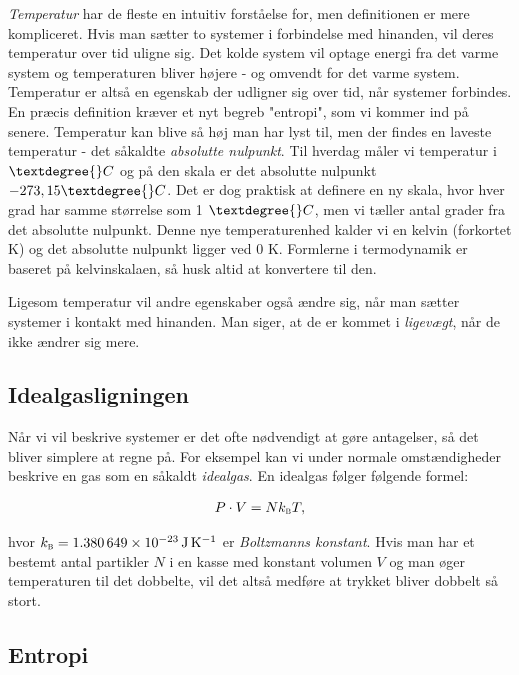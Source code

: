 \documentclass[crop=false, class=memoir]{standalone}
\begin{document}
\emph{Temperatur} har de fleste en intuitiv forståelse for, men definitionen er mere kompliceret. Hvis man sætter to systemer i forbindelse med hinanden, vil deres temperatur over tid uligne sig. Det kolde system vil optage energi fra det varme system og temperaturen bliver højere - og omvendt for det varme system. Temperatur er altså en egenskab der udligner sig over tid, når systemer forbindes. En præcis definition kræver et nyt begreb "entropi", som vi kommer ind på senere. Temperatur kan blive så høj man har lyst til, men der findes en laveste temperatur - det såkaldte \emph{absolutte nulpunkt}. Til hverdag måler vi temperatur i $\textdegree{}C$ og på den skala er det absolutte nulpunkt $-273,15\textdegree{}C$. Det er dog praktisk at definere en ny skala, hvor hver grad har samme størrelse som 1 $\textdegree{}C$, men vi tæller antal grader fra det absolutte nulpunkt. Denne nye temperaturenhed kalder vi en kelvin (forkortet K) og det absolutte nulpunkt ligger ved 0 K. Formlerne i termodynamik er baseret på kelvinskalaen, så husk altid at konvertere til den.


Ligesom temperatur vil andre egenskaber også ændre sig, når man sætter systemer i kontakt med hinanden. Man siger, at de er kommet i \emph{ligevægt}, når de ikke ændrer sig mere.

\subsection{Idealgasligningen}

Når vi vil beskrive systemer er det ofte nødvendigt at gøre antagelser, så det bliver simplere at regne på. For eksempel kan vi under normale omstændigheder beskrive en gas som en såkaldt \emph{idealgas}. En idealgas følger følgende formel:

\begin{align}
    P \cdot V = Nk_\textsc{b} T,
    \label{termo:eq:ideal}
\end{align}

hvor $k_\textsc{b} = \SI{1.380649e-23}{\joule \per \kelvin}$ er \emph{Boltzmanns konstant}. Hvis man har et bestemt antal partikler $N$ i en kasse med konstant volumen $V$ og man øger temperaturen til det dobbelte, vil det altså medføre at trykket bliver dobbelt så stort.

\subsection{Entropi}
\end{document}
